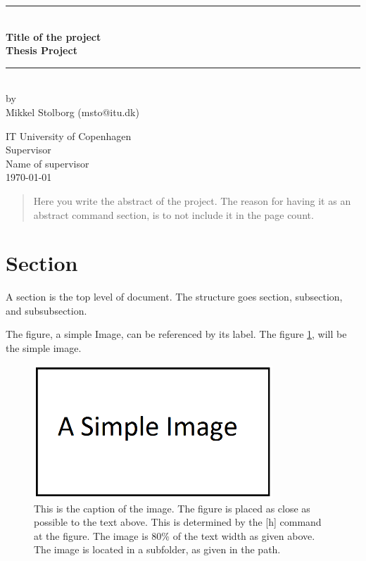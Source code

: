 \documentclass[a4paper,11pt]{article}
\begin{document}
\lstset{language=C}  

\begin{titlepage}
\centering \parindent=0pt
\newcommand{\HRule}{\rule{\textwidth}{1mm}}
 \HRule\\[1cm]\large\bfseries
Title of the project\\[0.7cm]
\large Thesis Project\\[1cm]
\HRule\\[1cm]


\large by 
\\Mikkel Stolborg (msto@itu.dk)
 \normalsize
\begin{flushleft}
IT University of Copenhagen \\
Supervisor\\
Name of supervisor\\
\today \end{flushleft}
\end{titlepage}

\begin{abstract}
Here you write the abstract of the project. The reason for having it as an abstract command section, is to not include it in the page count.
\end{abstract}
\pagebreak
\tableofcontents
\pagebreak
\section{Section}
A section is the top level of document. The structure goes section, subsection, and subsubsection.

The figure, a simple Image, can be referenced by its label. The figure \ref{fig:simpleImage}, will be the simple image.

\begin{figure}[h]
    \centering
    \includegraphics[width=0.8\textwidth]{Images/SimpleImage.png}
    \caption{This is the caption of the image. The figure is placed as close as possible to the text above. This is determined by the [h] command at the figure. The image is 80\% of the text width as given above. The image is located in a subfolder, as given in the path.}
    \label{fig:simpleImage}
\end{figure}
\end{document}
